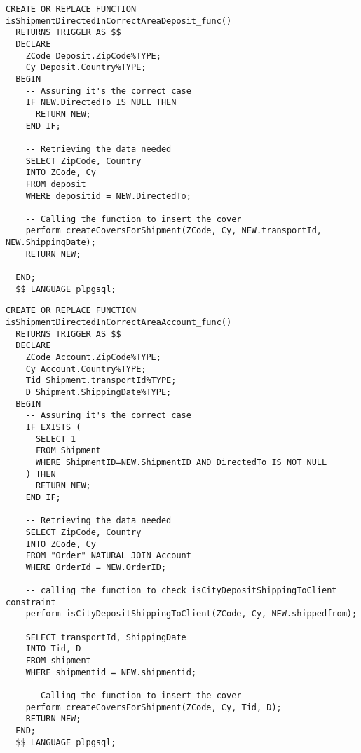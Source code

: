 \begin{lstlisting}[caption={Funzione per le spedizioni verso depositi}]
  CREATE OR REPLACE FUNCTION isShipmentDirectedInCorrectAreaDeposit_func() 
  RETURNS TRIGGER AS $$
  DECLARE 
    ZCode Deposit.ZipCode%TYPE;
    Cy Deposit.Country%TYPE;
  BEGIN 
    -- Assuring it's the correct case
    IF NEW.DirectedTo IS NULL THEN 
      RETURN NEW;
    END IF;

    -- Retrieving the data needed
    SELECT ZipCode, Country 
    INTO ZCode, Cy
    FROM deposit
    WHERE depositid = NEW.DirectedTo;

    -- Calling the function to insert the cover
    perform createCoversForShipment(ZCode, Cy, NEW.transportId, NEW.ShippingDate);
    RETURN NEW;

  END;
  $$ LANGUAGE plpgsql;
\end{lstlisting}

\begin{lstlisting}[caption={Funzione per le spedizioni verso clienti}]
  CREATE OR REPLACE FUNCTION isShipmentDirectedInCorrectAreaAccount_func() 
  RETURNS TRIGGER AS $$
  DECLARE 
    ZCode Account.ZipCode%TYPE;
    Cy Account.Country%TYPE;
    Tid Shipment.transportId%TYPE;
    D Shipment.ShippingDate%TYPE;
  BEGIN 
    -- Assuring it's the correct case
    IF EXISTS (
      SELECT 1
      FROM Shipment
      WHERE ShipmentID=NEW.ShipmentID AND DirectedTo IS NOT NULL
    ) THEN
      RETURN NEW;
    END IF;
  
    -- Retrieving the data needed
    SELECT ZipCode, Country 
    INTO ZCode, Cy
    FROM "Order" NATURAL JOIN Account
    WHERE OrderId = NEW.OrderID;

    -- calling the function to check isCityDepositShippingToClient constraint
    perform isCityDepositShippingToClient(ZCode, Cy, NEW.shippedfrom);
  
    SELECT transportId, ShippingDate
    INTO Tid, D
    FROM shipment
    WHERE shipmentid = NEW.shipmentid;
  
    -- Calling the function to insert the cover
    perform createCoversForShipment(ZCode, Cy, Tid, D);
    RETURN NEW;
  END;
  $$ LANGUAGE plpgsql;
\end{lstlisting}

